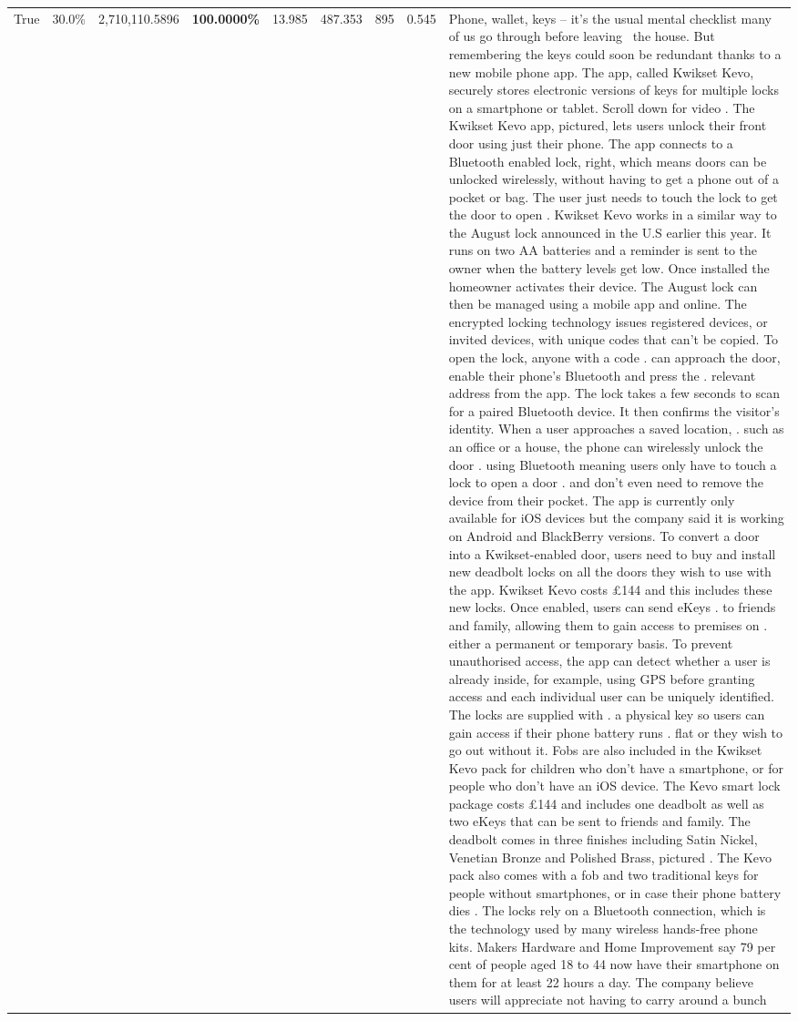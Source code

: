 \begin{table}[H]
\begin{tabular}{lllrlllll}
True & 30.0\% & 2,710,110.5896 & \bfseries \color{red} 100.0000\% & 13.985 & 487.353 & 895 & 0.545 & Phone, wallet, keys – it’s the usual mental checklist many of us go through before leaving  the house. But remembering the keys could soon be redundant thanks to a new mobile phone app. The app, called Kwikset Kevo, securely stores electronic versions of keys for multiple locks on a smartphone or tablet. Scroll down for video . The Kwikset Kevo app, pictured, lets users unlock their front door using just their phone. The app connects to a Bluetooth enabled lock, right, which means doors can be unlocked wirelessly, without having to get a phone out of a pocket or bag. The user just needs to touch the lock to get the door to open . Kwikset Kevo works in a similar way to the August lock announced in the U.S earlier this year. It runs on two AA batteries and a reminder is sent to the owner when the battery levels get low. Once installed the homeowner activates their device. The August lock can then be managed using a mobile app and online. The encrypted locking technology issues registered devices, or invited devices, with unique codes that can't be copied. To open the lock, anyone with a code . can approach the door, enable their phone's Bluetooth and press the . relevant address from the app. The lock takes a few seconds to scan for a paired Bluetooth device. It then confirms the visitor's identity. When a user approaches a saved location, . such as an office or a house, the phone can wirelessly unlock the door . using Bluetooth meaning users only have to touch a lock to open a door . and don't even need to remove the device from their pocket. The app is currently only available for iOS devices but the company said it is working on Android and BlackBerry versions. To convert a door into a Kwikset-enabled door, users need to buy and install new deadbolt locks on all the doors they wish to use with the app. Kwikset Kevo costs £144 and this includes these new locks. Once enabled, users can send eKeys . to friends and family, allowing them to gain access to premises on . either a permanent or temporary basis. To prevent unauthorised access, the app can detect whether a user is already inside, for example, using GPS before granting access and each individual user can be uniquely identified. The locks are supplied with . a physical key so users can gain access if their phone battery runs . flat or they wish to go out without it. Fobs are also included in the Kwikset Kevo pack for children who don't have a smartphone, or for people who don't have an iOS device. The Kevo smart lock package costs £144 and includes one deadbolt as well as two eKeys that can be sent to friends and family. The deadbolt comes in three finishes including Satin Nickel, Venetian Bronze and Polished Brass, pictured . The Kevo pack also comes with a fob and two traditional keys for people without smartphones, or in case their phone battery dies . The locks rely on a Bluetooth connection, which is the technology used by many wireless hands-free phone kits. Makers Hardware and Home Improvement say 79 per cent of people aged 18 to 44 now have their smartphone on them for at least 22 hours a day. The company believe users will appreciate not having to carry around a bunch 
\end{tabular}
\end{table}
